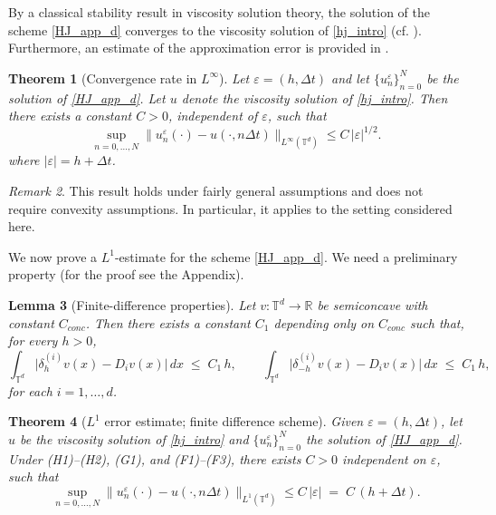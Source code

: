\documentclass[11pt]{amsart}
\newtheorem{thm}{Theorem}[section]
\newtheorem{lemma}[thm]{Lemma}
\theoremstyle{remark}
\newtheorem{rem}[thm]{Remark}
\theoremstyle{definition}
\theoremstyle{Claim}
\newcommand{\T}{{\mathbb{T}}}
\newcommand{\R}{\mathbb{R}}
\theoremstyle{plain}
\begin{document}
By a classical stability result in viscosity solution theory, the solution of the scheme \eqref{HJ_app_d} converges to the viscosity solution of \eqref{hj_intro} (cf. \cite{bs}). Furthermore, an estimate of the approximation error is provided in \cite{cl}.
\begin{thm}[Convergence rate in \(L^\infty\)]\label{thm:Linfty_estimate}
Let \(\varepsilon=(h,\Delta t)\) and let \(\{u^\varepsilon_n\}_{n=0}^N\) be the solution of \eqref{HJ_app_d}. Let \(u\) denote the viscosity solution of \eqref{hj_intro}. Then there exists a constant \(C>0\), independent of \(\varepsilon\), such that
\begin{equation}\label{stima_Linfty_d}
  \sup_{n=0,\dots,N}\big\|u^\varepsilon_n(\cdot) - u(\cdot,n\Delta t)\big\|_{L^\infty(\T^d)}
  \le C\,|\varepsilon|^{1/2}.
\end{equation}
where $|\varepsilon|=h+\Delta t$.
\end{thm}
\begin{rem}
This result holds under fairly general assumptions and does not require   convexity assumptions. In particular, it applies to the setting considered here.
\end{rem}
We now prove a $L^1$-estimate for the scheme \eqref{HJ_app_d}. We need a preliminary property (for the proof see the Appendix).
\begin{lemma}[Finite-difference properties]\label{lemma:finite_difference}
	Let $v:\T^d\to\R$ be semiconcave with constant $C_{conc}$.
	Then there exists a constant $C_1$ depending only on $C_{conc}$ such that, for every \(h>0\),
	\begin{equation}\label{eq:finite_diff_est_d}
		\int_{\T^d} \big|\delta_{h}^{(i)} v(x) - D_i v(x)\big|\,dx
		\;\le\; C_1\, h, \qquad
		\int_{\T^d} \big|\delta_{-h}^{(i)} v(x) - D_i v(x)\big|\,dx
		\;\le\; C_1\, h,
	\end{equation}
	for each \(i=1,\dots,d\).
\end{lemma}
\begin{thm}[$L^1$ error estimate; finite difference scheme]\label{thm:stima_L1_finitediff}
Given $\varepsilon=(h,\Delta t)$, let $u$ be the viscosity solution of \eqref{hj_intro} and \(\{u^\varepsilon_n\}_{n=0}^N\) the solution of \eqref{HJ_app_d}. Under (H1)--(H2), (G1), and (F1)--(F3), there exists \(C>0\) independent on \(\varepsilon\), such that
\begin{equation}\label{stima_L1}
  \sup_{n=0,\dots,N}\big\|u_n^\varepsilon(\cdot)-u(\cdot,n\Delta t)\big\|_{L^1(\mathbb{T}^d)}
  \le C\,|\varepsilon| \;=\; C\,(h+\Delta t).
\end{equation}

\end{thm}
\end{document}
